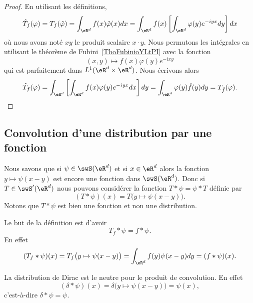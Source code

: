 \begin{proof}
	En utilisant les définitions,
	\begin{equation}
		\hat T_f(\varphi)=T_f(\hat \varphi)=\int_{\eR^d}f(x)\hat \varphi(x)dx=\int_{\eR^d}f(x)\left[ \int_{\eR^d}\varphi(y) e^{-iyx}dy \right]dx
	\end{equation}
	où nous avons noté \( xy\) le produit scalaire \( x\cdot y\). Nous permutons les intégrales en utilisant le théorème de Fubini~\ref{ThoFubinioYLtPI} avec la fonction
	\begin{equation}
		(x,y)\mapsto f(x)\varphi(y) e^{-ixy}
	\end{equation}
	qui est parfaitement dans \( L^1(\eR^d\times \eR^d)\). Nous écrivons alors
	\begin{equation}
		\hat T_f(\varphi)=\int_{\eR^d}\left[ \int_{\eR^d}f(x)\varphi(y) e^{-iyx}dx \right]dy=\int_{\eR^d}\varphi(y)\hat f(y)dy=T_{\hat f}(\varphi).
	\end{equation}
\end{proof}

\subsection{Convolution d'une distribution par une fonction}

Nous savons que si \( \psi\in\swS(\eR^d)\) et si \( x\in\eR^d\) alors la fonction \( y\mapsto\psi(x-y)\) est encore une fonction dans \( \swS(\eR^d)\). Donc si \( T\in\swS'(\eR^d)\) nous pouvons considérer la fonction \( T*\psi=\psi*T\) définie par
\begin{equation}        \label{EQooOUXKooGHDSzL}
	(T*\psi)(x)=T\big( y\mapsto\psi(x-y) \big).
\end{equation}
Notons que \( T*\psi\) est bien une fonction et non une distribution.

Le but de la définition est d'avoir
\begin{equation}
	T_f*\psi=f*\psi.
\end{equation}
En effet
\begin{equation}
	(T_f*\psi)(x)=T_f\big( y\mapsto \psi(x-y) \big)=\int_{\eR^d}f(y)\psi(x-y)dy=(f*\psi)(x).
\end{equation}

\begin{example}
	La distribution de Dirac est le neutre pour le produit de convolution. En effet
	\begin{equation}
		(\delta*\psi)(x)=\delta\big( y\mapsto\psi(x-y) \big)=\psi(x),
	\end{equation}
	c'est-à-dire \( \delta*\psi=\psi\).
\end{example}

